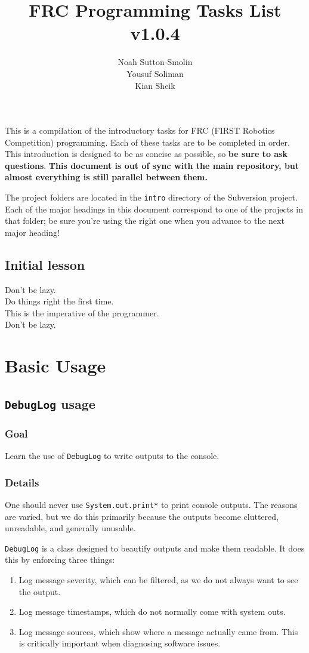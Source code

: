 \documentclass[a4paper]{article}
\title{FRC Programming Tasks List v1.0.4}
\author{Noah Sutton-Smolin\\Yousuf Soliman\\Kian Sheik}
\begin{document}
\setcounter{tocdepth}{2}\maketitle\tableofcontents\pagebreak

This is a compilation of the introductory tasks for FRC (FIRST Robotics Competition) programming. Each of these tasks are to be completed in order. This introduction is designed to be as concise as possible, so \textbf{be sure to ask questions}. \textbf{This document is out of sync with the main repository, but almost everything is still parallel between them.}

The project folders are located in the \lstinline{intro} directory of the Subversion project. Each of the major headings in this document correspond to one of the projects in that folder; be sure you're using the right one when you advance to the next major heading!

\subsection{Initial lesson}
Don't be lazy.\\Do things right the first time.\\This is the imperative of the programmer.\\Don't be lazy.

\pagebreak\section{Basic Usage}
\subsection{\lstinline{DebugLog} usage}
\subsubsection{Goal} Learn the use of \lstinline{DebugLog} to write outputs to the console.
\subsubsection{Details} One should never use \lstinline{System.out.print*} to print console outputs. The reasons are varied, but we do this primarily because the outputs become cluttered, unreadable, and generally unusable. 

\lstinline{DebugLog} is a class designed to beautify outputs and make them readable. It does this by enforcing three things:
\begin{enumerate}\item{Log message severity, which can be filtered, as we do not always want to see the output.}\item{Log message timestamps, which do not normally come with system outs.}\item{Log message sources, which show where a message actually came from. This is critically important when diagnosing software issues.}\end{enumerate}
\end{document}
